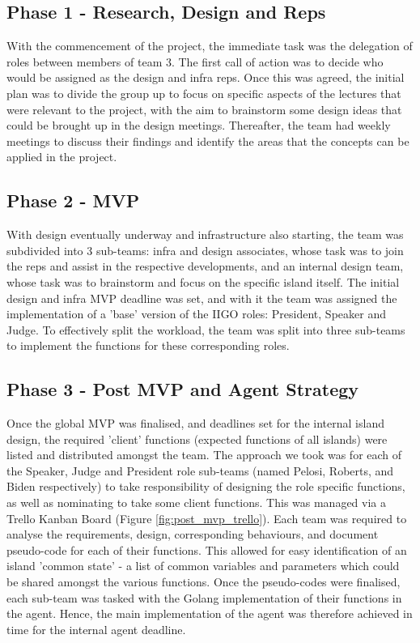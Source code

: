 \subsection{Phase 1 - Research, Design and Reps }
With the commencement of the project, the immediate task was the delegation of roles between members of team 3. The first call of action was to decide who would be assigned as the design and infra reps. Once this was agreed, the initial plan was to divide the group up to focus on specific aspects of the lectures that were relevant to the project, with the aim to brainstorm some design ideas that could be brought up in the design meetings. Thereafter, the team had weekly meetings to discuss their findings and identify the areas that the concepts can be applied in the project.
\subsection{Phase 2 - MVP}
With design eventually underway and infrastructure also starting, the team was subdivided into 3 sub-teams: infra and design associates, whose task was to join the reps and assist in the respective developments, and an internal design team, whose task was to brainstorm and focus on the specific island itself. The initial design and infra MVP deadline was set, and with it the team was assigned the implementation of a 'base' version of the IIGO roles: President, Speaker and Judge. To effectively split the workload, the team was split into three sub-teams to implement the functions for these corresponding roles.

\subsection{Phase 3 - Post MVP and Agent Strategy}
Once the global MVP was finalised, and deadlines set for the internal island design, the required 'client' functions (expected functions of all islands) were listed and distributed amongst the team. The approach we took was for each of the Speaker, Judge and President role sub-teams (named Pelosi, Roberts, and Biden respectively) to take responsibility of designing the role specific functions, as well as nominating to take some client functions. This was managed via a Trello Kanban Board (Figure \ref{fig:post_mvp_trello}). Each team was required to analyse the requirements, design, corresponding behaviours, and document pseudo-code for each of their functions. This allowed for easy identification of an island 'common state' - a list of common variables and parameters which could be shared amongst the various functions. Once the pseudo-codes were finalised, each sub-team was tasked with the Golang implementation of their functions in the agent. Hence, the main implementation of the agent was therefore achieved in time for the internal agent deadline.

